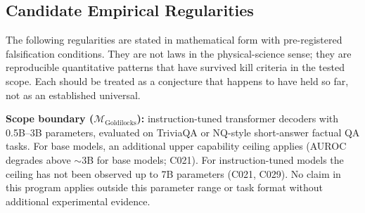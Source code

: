 \documentclass[11pt]{article}
\begin{document}
\subsection{Candidate Empirical Regularities}
\label{sec:laws}

The following regularities are stated in mathematical form with pre-registered
falsification conditions. They are not laws in the physical-science sense; they are
reproducible quantitative patterns that have survived kill criteria in the tested
scope. Each should be treated as a conjecture that happens to have held so far, not
as an established universal.

\textbf{Scope boundary ($\mathcal{M}_{\text{Goldilocks}}$):} instruction-tuned
transformer decoders with 0.5B--3B parameters, evaluated on TriviaQA or
NQ-style short-answer factual QA tasks. For base models, an additional upper
capability ceiling applies (AUROC degrades above $\sim$3B for base models; C021).
For instruction-tuned models the ceiling has not been observed up to 7B parameters
(C021, C029). No claim in this program applies outside this parameter range or
task format without additional experimental evidence.
\end{document}

